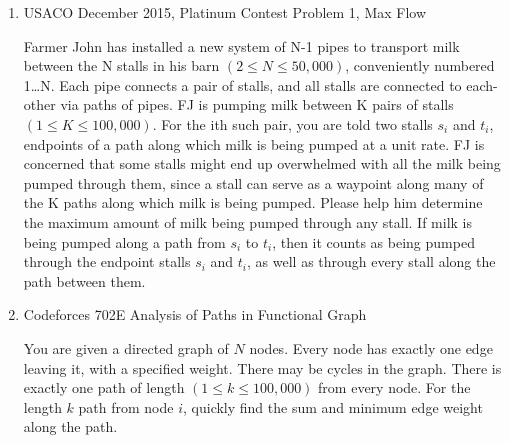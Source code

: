 \documentclass{article}
\begin{document}
\begin{enumerate}
    \item USACO December 2015, Platinum Contest Problem 1, Max Flow
    
    Farmer John has installed a new system of N-1 pipes to transport milk between the N stalls in his barn $(2\leq N\leq 50,000)$, conveniently numbered 1…N. Each pipe connects a pair of stalls, and all stalls are connected to each-other via paths of pipes.
FJ is pumping milk between K pairs of stalls $(1\leq K\leq 100,000)$. For the ith such pair, you are told two stalls $s_i$ and $t_i$, endpoints of a path along which milk is being pumped at a unit rate. FJ is concerned that some stalls might end up overwhelmed with all the milk being pumped through them, since a stall can serve as a waypoint along many of the K paths along which milk is being pumped. Please help him determine the maximum amount of milk being pumped through any stall. If milk is being pumped along a path from $s_i$ to $t_i$, then it counts as being pumped through the endpoint stalls $s_i$ and $t_i$, as well as through every stall along the path between them.
    \item Codeforces 702E Analysis of Paths in Functional Graph
    
    You are given a directed graph of $N$ nodes.  Every node has exactly one edge leaving it, with a specified weight.  There may be cycles in the graph.  There is exactly one path of length $(1\leq k\leq 100,000)$ from every node.  For the length $k$ path from node $i$, quickly find the sum and minimum edge weight along the path.  

\end{enumerate}
\end{document}
